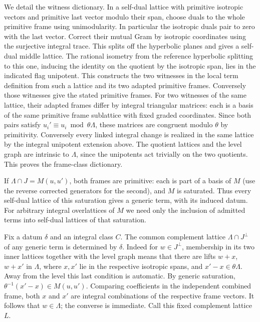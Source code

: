 We detail the witness dictionary. In a self-dual lattice with
primitive isotropic vectors and primitive last vector modulo
their span, choose duals to the whole primitive frame using
unimodularity. In particular the isotropic duals pair to zero
with the last vector. Correct their mutual Gram by isotropic
coordinates using the surjective integral trace. This splits
off the hyperbolic planes and gives a self-dual middle lattice.
The rational isometry from the reference hyperbolic splitting
to this one, inducing the identity on the quotient by the
isotropic span, lies in the indicated flag unipotent. This
constructs the two witnesses in the local term definition
from such a lattice and its two adapted primitive frames.
Conversely those witnesses give the stated primitive frames.
For two witnesses of the same lattice, their adapted frames
differ by integral triangular matrices: each is a basis
of the same primitive frame sublattice with fixed graded
coordinates. Since both pairs satisfy
\(u_i'\equiv u_i\bmod\theta\Lambda\), these matrices are
congruent modulo \(\theta\) by primitivity.
Conversely every linked integral change is realized in the
same lattice by the integral unipotent extension above.
The quotient lattices and the level graph are intrinsic to
\(\Lambda\), since the unipotents act trivially on the
two quotients. This proves the frame-class dictionary.

If \(\Lambda\cap J=M(u,u')\), both frames are primitive:
each is part of a basis of \(M\) (use the reverse
corrected generators for the second), and \(M\) is saturated.
Thus every self-dual lattice of this saturation gives a
generic term, with its induced datum. For arbitrary integral
overlattices of \(M\) we need only the inclusion of admitted
terms into self-dual lattices of that saturation.

Fix a datum \(\delta\) and an integral class \(C\).
The common complement lattice \(\Lambda\cap J^\perp\)
of any generic term is determined by \(\delta\).
Indeed for \(w\in J^\perp\), membership in its two inner
lattices together with the level graph means that there are
lifts \(w+x\), \(w+x'\) in \(\Lambda\), where \(x,x'\) lie in the
respective isotropic spans, and \(x'-x\in\theta\Lambda\).
Away from the level this last condition is automatic.
By generic saturation,
\(\theta^{-1}(x'-x)\in M(u,u')\). Comparing coefficients
in the independent combined frame, both \(x\) and \(x'\)
are integral combinations of the respective frame vectors.
It follows that \(w\in\Lambda\); the converse is immediate.
Call this fixed complement lattice \(L\).

